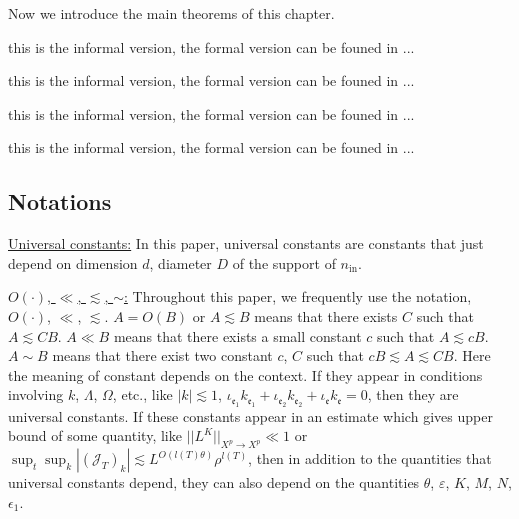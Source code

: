Now we introduce the main theorems of this chapter.

\begin{thm}\label{th.wickr_informal} this is the informal version, the formal version can be founed in ...
\end{thm}

\begin{thm}\label{th.cancellation_informal} this is the informal version, the formal version can be founed in ...
\end{thm}

\begin{thm}\label{th.loop_informal} this is the informal version, the formal version can be founed in ...
\end{thm}

\begin{thm}\label{th.enough_informal} this is the informal version, the formal version can be founed in ...
\end{thm}
 






 






 
\subsection{Notations}\label{sec.notat} 

\underline{Universal constants:} In this paper, universal constants are constants that just depend on dimension $d$, diameter $D$ of the support of $n_{\text{in}}$. 

\underline{$O(\cdot)$, $\ll$, $\lesssim$, $\sim$:} Throughout this paper, we frequently use the notation, $O(\cdot)$, $\ll$, $\lesssim$. $A=O(B)$ or $A\lesssim B$ means that there exists $C$ such that $A\lesssim CB$. $A\ll B$ means that there exists a small constant $c$ such that $A\lesssim cB$. $A\sim B$ means that there exist two constant $c$, $C$ such that $cB\lesssim A\lesssim CB$. Here the meaning of constant depends on the context. If they appear in conditions involving $k$, $\Lambda$, $\Omega$, etc., like $|k|\lesssim 1$, $\iota_{\mathfrak{e}_1}k_{\mathfrak{e}_1}+\iota_{\mathfrak{e}_2}k_{\mathfrak{e}_2}+\iota_{\mathfrak{e}}k_{\mathfrak{e}}=0$, then they are universal constants. If these constants appear in an estimate which gives upper bound of some quantity, like $||L^K||_{X^p\rightarrow X^p}\ll 1$ or $\sup_t\sup_k  |(\mathcal{J}_T)_k|\lesssim L^{O(l(T)\theta)} \rho^{l(T)}$, then in addition to the quantities that universal constants depend, they can also depend on the quantities $\theta$, $\varepsilon$, $K$, $M$, $N$, $\epsilon_1$.

